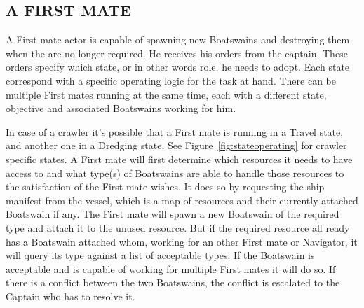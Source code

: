 \subsection{A FIRST MATE}\label{seq:first mate}

A First mate actor is capable of spawning new Boatswains and destroying them when the are no longer required. He
receives his orders from the captain. These orders specify which state, or in other words role, he needs to adopt. Each
state correspond with a specific operating logic for the task at hand. There can be multiple First mates running at the
same time, each with a different state, objective and associated Boatswains working for him.

In case of a crawler it's possible that a First mate is running in a Travel state, and another one in a Dredging state.
See Figure~\ref{fig:stateoperating} for crawler specific states. A First mate will first determine which resources it
needs to have access to and what type(s) of Boatswains are able to handle those resources to the satisfaction of the
First mate wishes. It does so by requesting the ship manifest from the vessel, which is a map of resources and their
currently attached Boatswain if any. The First mate will spawn a new Boatswain of the required type and attach it to the
unused resource. But if the required resource all ready has a Boatswain attached whom, working for an other First mate
or Navigator, it will query its type against a list of acceptable types. If the Boatswain is acceptable and is capable
of working for multiple First mates it will do so. If there is a conflict between the two Boatswains, the conflict is
escalated to the Captain who has to resolve it.

